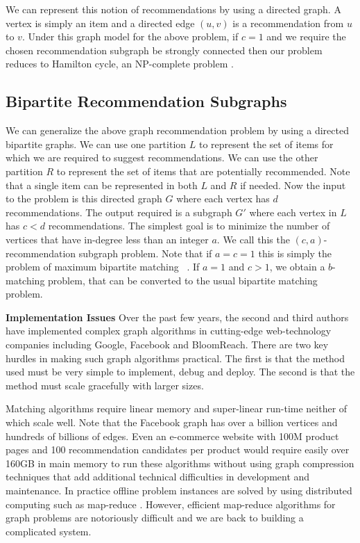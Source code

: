 We can represent this notion of recommendations by using a directed graph. A
vertex is simply an item and a directed edge $(u, v)$ is a recommendation from
$u$ to $v$. Under this graph model for the above problem, if $c=1$ and we
require the chosen recommendation subgraph be strongly connected then our
problem reduces to Hamilton cycle, an NP-complete problem \cite{CLRS2001}. \vs

\subsection{Bipartite Recommendation Subgraphs}

We can generalize the above graph recommendation problem by using a
directed bipartite graphs. We can use one partition $L$ to represent
the set of items for which we are required to suggest
recommendations. We can use the other partition $R$ to represent the
set of items that are potentially recommended. Note that a single item
can be represented in both $L$ and $R$ if needed.  Now the input to
the problem is this directed graph $G$ where each vertex has $d$
recommendations. The output required is a subgraph $G'$ where each
vertex in $L$ has $c < d$ recommendations. The simplest goal is to
minimize the number of vertices that have in-degree less than an
integer $a$. We call this the $(c, a)$-recommendation subgraph
problem.  Note that if $a=c=1$ this is simply the problem of maximum
bipartite matching ~\cite{LovaszPlummer1986}. If $a=1$ and $c > 1$,
we obtain a $b$-matching problem, that can be converted to the
usual bipartite matching problem. \cite{Gabow1983}

{\bf Implementation Issues} Over the past few years, the second and
third authors have implemented complex graph algorithms in
cutting-edge web-technology companies including Google, Facebook and
BloomReach. There are two key hurdles in making such graph algorithms
practical. The first is that the method used must be very simple to
implement, debug and deploy. The second is that the method must scale
gracefully with larger sizes. \vs

Matching algorithms require linear memory and super-linear run-time
neither of which scale well. Note that the Facebook graph has over a
billion vertices\cite{FacebookNodes} and hundreds of billions of edges\cite{}. Even an
e-commerce website with 100M product pages and 100 recommendation candidates per
product would require easily over 160GB in main memory to run these
algorithms without using graph compression techniques that add additional technical difficulties
in development and maintenance. In practice offline problem instances are solved by using
distributed computing such as map-reduce \cite{DeanGhemawat2004}. 
However, efficient map-reduce algorithms for graph problems
are notoriously difficult and we are back to building a complicated
system. \vs

